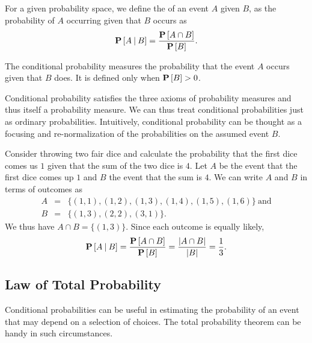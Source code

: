 \begin{definition}
For a given probability space, we define the  of an event $A$ given $B$, as the probability of $A$
occurring given that $B$ occurs as
\[
\mathbf{P}\left[{A {\:\mid\:} B}\right] = \frac{\mathbf{P}\left[{A \cap B}\right]}{\mathbf{P}\left[{B}\right]}. 
\]

The conditional probability measures the probability that the event
$A$ occurs given that $B$ does.  It is defined only when $\mathbf{P}\left[{B}\right] > 0$.
\end{definition}


\begin{flex}

\begin{gram}
Conditional probability satisfies the three axioms of probability measures and thus itself a probability measure.
We can thus treat conditional probabilities just as ordinary
probabilities.  Intuitively, conditional probability can be thought as
a focusing and re-normalization of the probabilities on the
assumed event $B$.
%
\end{gram}

\begin{example}
Consider throwing two fair dice and calculate the probability that the
first dice comes us $1$ given that the sum of the two dice is $4$. 
%
Let $A$ be the event  that the first dice comes up $1$ and $B$ the
event that the sum is $4$.
%
We can write $A$ and $B$ in terms of outcomes as 
\[
\begin{array}{lll}
A & = & \{ (1,1), (1,2), (1,3), (1,4), (1,5), (1,6) \}~\mbox{and}
\\
B & = & \{ (1,3), (2,2), (3,1) \}.
\end{array}
\]
We thus have $A \cap B = \{ (1,3) \}$.
%
Since each outcome is equally likely, 
\[
\prob{A \given B} = \frac{\prob{A \cap B}}{\prob{B}} 
%
= 
%
\frac{|A \cap B|}{|B|} = \frac{1}{3}.
\]
\end{example}
\end{flex}

\subsection{Law of Total Probability}
\label{sec:probability::theory::LTP}

  
Conditional probabilities can be useful in estimating the probability
of an event that may depend on a selection of choices.
%
The total probability theorem can be handy in such circumstances.


